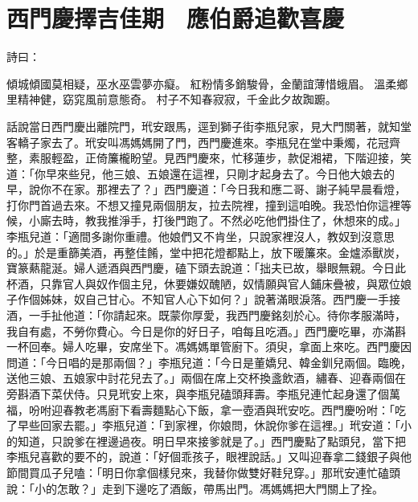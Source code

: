 %

\chapter{西門慶擇吉佳期　應伯爵追歡喜慶}

詩曰：

傾城傾國莫相疑，巫水巫雲夢亦癡。
紅粉情多銷駿骨，金蘭誼薄惜蛾眉。
溫柔鄉里精神健，窈窕風前意態奇。
村子不知春寂寂，千金此夕故踟躕。

話說當日西門慶出離院門，玳安跟馬，逕到獅子街李瓶兒家，見大門關著，就知堂客轎子家去了。玳安叫馮媽媽開了門，西門慶進來。李瓶兒在堂中秉燭，花冠齊整，素服輕盈，正倚簾櫳盼望。見西門慶來，忙移蓮步，款促湘裙，下階迎接，笑道：「你早來些兒，他三娘、五娘還在這裡，只剛才起身去了。今日他大娘去的早，說你不在家。那裡去了？」西門慶道：「今日我和應二哥、謝子純早晨看燈，打你門首過去來。不想又撞見兩個朋友，拉去院裡，撞到這咱晚。我恐怕你這裡等候，小廝去時，教我推淨手，打後門跑了。不然必吃他們掛住了，休想來的成。」李瓶兒道：「適間多謝你重禮。他娘們又不肯坐，只說家裡沒人，教奴到沒意思的。」於是重篩美酒，再整佳餚，堂中把花燈都點上，放下暖簾來。金爐添獸炭，寶篆爇龍涎。婦人遞酒與西門慶，磕下頭去說道：「拙夫已故，舉眼無親。今日此杯酒，只靠官人與奴作個主兒，休要嫌奴醜陋，奴情願與官人鋪床疊被，與眾位娘子作個姊妹，奴自己甘心。不知官人心下如何？」說著滿眼淚落。西門慶一手接酒，一手扯他道：「你請起來。既蒙你厚愛，我西門慶銘刻於心。待你孝服滿時，我自有處，不勞你費心。今日是你的好日子，咱每且吃酒。」西門慶吃畢，亦滿斟一杯回奉。婦人吃畢，安席坐下。馮媽媽單管廚下。須臾，拿面上來吃。西門慶因問道：「今日唱的是那兩個？」李瓶兒道：「今日是董嬌兒、韓金釧兒兩個。臨晚，送他三娘、五娘家中討花兒去了。」兩個在席上交杯換盞飲酒，繡春、迎春兩個在旁斟酒下菜伏侍。只見玳安上來，與李瓶兒磕頭拜壽。李瓶兒連忙起身還了個萬福，吩咐迎春教老馮廚下看壽麵點心下飯，拿一壺酒與玳安吃。西門慶吩咐：「吃了早些回家去罷。」李瓶兒道：「到家裡，你娘問，休說你爹在這裡。」玳安道：「小的知道，只說爹在裡邊過夜。明日早來接爹就是了。」西門慶點了點頭兒，當下把李瓶兒喜歡的要不的，說道：「好個乖孩子，眼裡說話。」又叫迎春拿二錢銀子與他節間買瓜子兒嗑：「明日你拿個樣兒來，我替你做雙好鞋兒穿。」那玳安連忙磕頭說：「小的怎敢？」走到下邊吃了酒飯，帶馬出門。馮媽媽把大門關上了拴。

